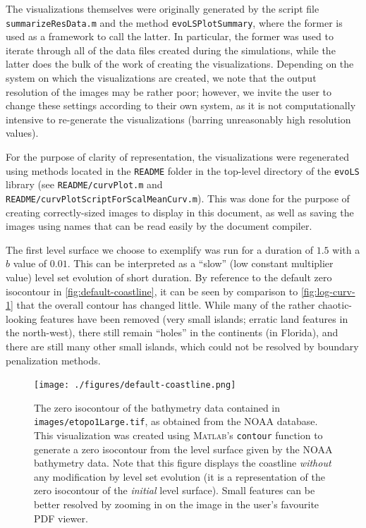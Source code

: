 \documentclass{article}
\begin{document}
The visualizations themselves were originally generated by the
script file \texttt{summarizeResData.m} and the method
\texttt{evoLSPlotSummary}, where the former is used as a framework
to call the latter. In particular, the former was used to iterate
through all of the data files created during the simulations,
while the latter does the bulk of the work of creating the
visualizations. Depending on the system on which the
visualizations are created, we note that the output resolution of
the images may be rather poor; however, we invite the user to
change these settings according to their own system, as it is not
computationally intensive to re-generate the visualizations
(barring unreasonably high resolution values). 

For the purpose of clarity of representation, the visualizations
were regenerated using methods located in the \texttt{README}
folder in the top-level directory of the \texttt{evoLS} library
(see \texttt{README/curvPlot.m} and\\
\texttt{README/curvPlotScriptForScalMeanCurv.m}). This was done
for the purpose of creating correctly-sized images to display in
this document, as well as saving the images using names that can
be read easily by the document compiler.

The first level surface we choose to exemplify was run for a
duration of $1.5$ with a $b$ value of $0.01$. This can be
interpreted as a ``slow'' (low constant multiplier value) level
set evolution of short duration. By reference to the default zero
isocontour in \autoref{fig:default-coastline}, it can be seen by
comparison to \autoref{fig:log-curv-1} that the overall contour
has changed little. While many of the rather chaotic-looking
features have been removed (very small islands; erratic land
features in the north-west), there still remain ``holes'' in the
continents (\eg in Florida), and there are still many other small
islands, which could not be resolved by boundary penalization
methods. 

\begin{figure}[h]
  \centering
  \texttt{[image: ./figures/default-coastline.png]}
  \caption{The zero isocontour of the bathymetry data contained in
    \texttt{images/etopo1Large.tif}, as obtained from the NOAA
    database. This visualization was created using
    \textsc{Matlab}'s \texttt{contour} function to generate a zero
    isocontour from the level surface given by the NOAA bathymetry
    data. Note that this figure displays the coastline
    \emph{without} any modification by level set evolution (\ie it
    is a representation of the zero isocontour of the
    \emph{initial} level surface). Small features can be better
    resolved by zooming in on the image in the user's favourite
    PDF viewer.}
\label{fig:default-coastline}
\end{figure}
\end{document}
